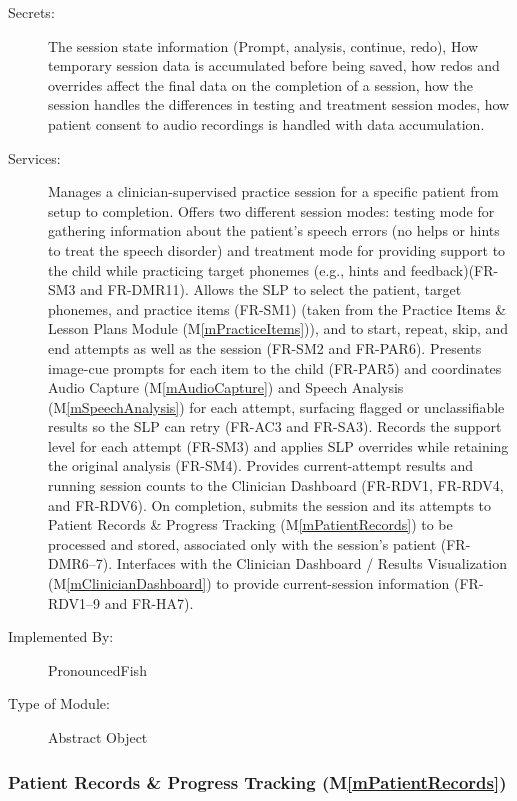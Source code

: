 \documentclass[12pt, titlepage]{article}
\newcommand{\mref}[1]{M\ref{#1}}
\begin{document}
\begin{description}
\item[Secrets:] The session state information (Prompt, analysis, continue, redo), 
How temporary session data is accumulated before being saved, 
how redos and overrides affect the final data on the completion of a session,
how the session handles the differences in testing and treatment session modes,
how patient consent to audio recordings is handled with data accumulation.
\item[Services:] Manages a clinician-supervised practice session for a specific patient from setup to completion. 
Offers two different session modes: testing mode for gathering information about the patient’s speech errors (no helps or hints to treat the speech disorder) and treatment mode for providing support to the child while practicing target phonemes (e.g., hints and feedback)(FR-SM3 and FR-DMR11).
Allows the SLP to select the patient, target phonemes, and practice items (FR-SM1) (taken from the Practice Items \& Lesson Plans Module (\mref{mPracticeItems})), and to start, repeat, skip, and end attempts as well as the session (FR-SM2 and FR-PAR6). 
Presents image-cue prompts for each item to the child (FR-PAR5) and coordinates Audio Capture (\mref{mAudioCapture}) and Speech Analysis (\mref{mSpeechAnalysis}) for each attempt, surfacing flagged or unclassifiable results so the SLP can retry (FR-AC3 and FR-SA3). 
Records the support level for each attempt (FR-SM3) and applies SLP overrides while retaining the original analysis (FR-SM4). 
Provides current-attempt results and running session counts to the Clinician Dashboard (FR-RDV1, FR-RDV4, and FR-RDV6).
On completion, submits the session and its attempts to Patient Records \& Progress Tracking (\mref{mPatientRecords}) to be processed and stored, associated only with the session’s patient (FR-DMR6--7). 
Interfaces with the Clinician Dashboard / Results Visualization (\mref{mClinicianDashboard}) to provide current-session information (FR-RDV1--9 and FR-HA7).
\item[Implemented By:] PronouncedFish
\item[Type of Module:] Abstract Object
\end{description}


\subsubsection{Patient Records \& Progress Tracking (\mref{mPatientRecords})}
\end{document}
